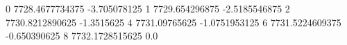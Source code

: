 0 7728.4677734375 -3.705078125
1 7729.654296875 -2.5185546875
2 7730.8212890625 -1.3515625
4 7731.09765625 -1.0751953125
6 7731.5224609375 -0.650390625
8 7732.1728515625 0.0
